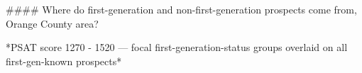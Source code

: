 #### Where do first-generation and non-first-generation prospects come from, Orange County area?

*PSAT score 1270 - 1520 — focal first-generation-status groups overlaid on all first-gen-known prospects*
